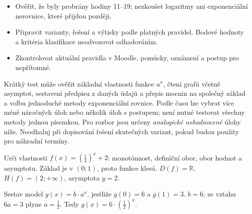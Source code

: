 \documentclass[11pt,a4paper]{article}
\begin{document}
\begin{itemize}[label=$\square$]
\item Ověřit, že byly probrány hodiny 11--19; nezkoušet logaritmy ani exponenciální nerovnice, které přijdou později.
\item Připravit varianty, řešení a výtisky podle platných pravidel. Bodové hodnoty a kritéria klasifikace neodvozovat odhadováním.
\item Zkontrolovat aktuální pravidla v Moodle, pomůcky, oznámení a postup pro nepřítomné.
\end{itemize}
Krátký test může ověřit základní vlastnosti funkce $a^x$, čtení grafů včetně asymptot, sestavení předpisu z daných údajů a přepis mocnin na společný základ a volbu jednoduché metody exponenciální rovnice. Podle času lze vybrat více méně náročných úloh nebo několik úloh s postupem; není nutné testovat všechny metody jednou písemkou.
Pro rozbor jsou určeny \emph{analogické nehodnocené} úlohy níže. Neodhaluj při dopisování řešení skutečných variant, pokud budou použity pro náhradní termíny.
\begin{prikladReseniBox}[title={Příklad 1}]
Urči vlastnosti $f(x)=(\frac{1}{4})^x+2$: monotónnost, definiční obor, obor hodnot a asymptotu.
\tcblower
Základ je v $(0;1)$, proto funkce klesá. $D(f)=\mathbb R$, $H(f)=(2;+\infty)$, asymptota $y=2$.
\end{prikladReseniBox}
\begin{prikladReseniBox}[title={Příklad 2}]
Sestav model $g(x)=b\cdot a^x$, jestliže $g(0)=6$ a $g(1)=3$.
\tcblower
$b=6$; ze vztahu $6a=3$ plyne $a=\frac{1}{2}$. Tedy $g(x)=6\cdot\left(\frac{1}{2}\right)^x$.
\end{prikladReseniBox}
\end{document}
